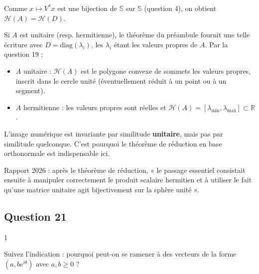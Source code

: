 \documentclass[11pt,a4paper]{article}
\providecommand{\tightlist}{\setlength{\itemsep}{0pt}\setlength{\parskip}{0pt}}
\newcommand{\equationajustee}[1]{%
  \sbox{\boiteequation}{$\displaystyle #1$}%
  \ifdim\wd\boiteequation>\linewidth
    \[\resizebox{\linewidth}{!}{\usebox{\boiteequation}}\]%
  \else
    \[#1\]%
  \fi}
\begin{document}
Comme \(x\mapsto V^*x\) est une bijection de \(\mathbb S\) sur \(\mathbb S\) (question 4), on obtient \(\mathcal H(A)=\mathcal H(D)\).

Si \(A\) est unitaire (resp. hermitienne), le théorème du préambule fournit une telle écriture avec \(D=\mathrm{diag}(\lambda_i)\), les \(\lambda_i\) étant les valeurs propres de \(A\). Par la question 19 :

\equationajustee{\boxed{\mathcal H(A)=\mathrm{conv}\big(\sigma(A)\big)}}

\begin{itemize}
\tightlist
\item
  \(A\) unitaire : \(\mathcal H(A)\) est le polygone convexe de sommets les valeurs propres, inscrit dans le cercle unité (éventuellement réduit à un point ou à un segment).
\item
  \(A\) hermitienne : les valeurs propres sont réelles et \(\mathcal H(A)=[\lambda_{\min},\allowbreak \lambda_{\max}]\subset\mathbb R\).
\end{itemize}

\begin{methode}

L'image numérique est invariante par similitude \textbf{unitaire}, mais pas par similitude quelconque. C'est pourquoi le théorème de réduction en base orthonormale est indispensable ici.

\end{methode}

\begin{jury}

Rapport 2026 : après le théorème de réduction, « le passage essentiel consistait ensuite à manipuler correctement le produit scalaire hermitien et à utiliser le fait qu'une matrice unitaire agit bijectivement sur la sphère unité ».

\end{jury}

\hypertarget{question-21}{%
\subsection{Question 21}\label{question-21}}

\begin{indication}{1}

Suivez l'indication : pourquoi peut-on se ramener à des vecteurs de la forme \((a,be^{i\theta})\) avec \(a,b\ge0\) ?

\end{indication}
\end{document}
